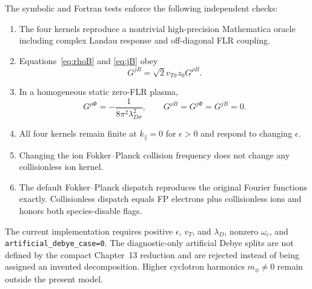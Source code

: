 \documentclass[11pt]{article}
\newcommand{\kpar}{k_{\parallel}}
\newcommand{\vth}{v_{T\sigma}}
\newcommand{\ld}{\lambda_{D\sigma}}
\begin{document}
The symbolic and Fortran tests enforce the following independent checks:
\begin{enumerate}
 \item The four kernels reproduce a nontrivial high-precision Mathematica
       oracle including complex Landau response and off-diagonal FLR coupling.
 \item Equations~\eqref{eq:rhoB} and \eqref{eq:jB} obey
       \begin{equation}
         G^{jB}=\sqrt{2}\vth z_0G^{\rho B}.
       \end{equation}
 \item In a homogeneous static zero-FLR plasma,
       \begin{equation}
         G^{\rho\Phi}=-\frac{1}{8\pi^2\ld^2},\qquad
         G^{\rho B}=G^{j\Phi}=G^{jB}=0.
       \end{equation}
 \item All four kernels remain finite at $\kpar=0$ for $\epsilon>0$ and
       respond to changing $\epsilon$.
 \item Changing the ion Fokker--Planck collision frequency does not change any
       collisionless ion kernel.
 \item The default Fokker--Planck dispatch reproduces the original Fourier
       functions exactly.  Collisionless dispatch equals FP electrons plus
       collisionless ions and honors both species-disable flags.
\end{enumerate}

The current implementation requires positive $\epsilon$, $v_T$, and
$\lambda_D$, nonzero $\omega_c$, and
\texttt{artificial\_debye\_case=}\allowbreak\texttt{0}.  The diagnostic-only artificial Debye
splits are not defined by the compact Chapter~13 reduction and are rejected
instead of being assigned an invented decomposition.  Higher cyclotron
harmonics $m_\phi\ne0$ remain outside the present model.
\end{document}
